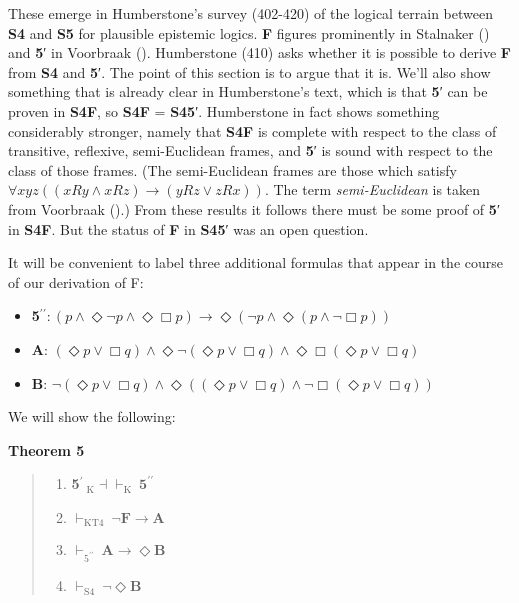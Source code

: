\documentclass[
  10pt,
  letterpaper,
  DIV=11,
  numbers=noendperiod,
  twoside]{scrartcl}
\providecommand{\tightlist}{%
  \setlength{\itemsep}{0pt}\setlength{\parskip}{0pt}}\usepackage{longtable,booktabs,array}
\begin{document}
These emerge in Humberstone's survey (402-420) of the logical terrain
between \textbf{S4} and \textbf{S5} for plausible epistemic logics.
\textbf{F} figures prominently in Stalnaker
() and \textbf{5}′ in Voorbraak
(). Humberstone (410) asks whether it
is possible to derive \textbf{F} from \textbf{S4} and \textbf{5}′. The
point of this section is to argue that it is. We'll also show something
that is already clear in Humberstone's text, which is that \textbf{5}′
can be proven in \textbf{S4F}, so \textbf{S4F} = \textbf{S45}′.
Humberstone in fact shows something considerably stronger, namely that
\textbf{S4F} is complete with respect to the class of transitive,
reflexive, semi-Euclidean frames, and \textbf{5}′ is sound with respect
to the class of those frames. (The semi-Euclidean frames are those which
satisfy \(\forall xyz((xRy \wedge xRz) \rightarrow (yRz \vee zRx))\).
The term \emph{semi-Euclidean} is taken from Voorbraak
().) From these results it follows
there must be some proof of \textbf{5}′ in \textbf{S4F}. But the status
of \textbf{F} in \textbf{S45}′ was an open question.

It will be convenient to label three additional formulas that appear in
the course of our derivation of F:

\begin{itemize}
\tightlist
\item
  \textbf{5}\(^{\prime\prime}\!: (p \wedge \Diamond\neg p \wedge \Diamond\Box p) \rightarrow \Diamond(\neg p \wedge \Diamond(p\wedge \neg \Box p))\)
\item
  \textbf{A}:
  \((\Diamond{p}\vee \Box q) \wedge \Diamond\neg (\Diamond{p}\vee \Box q) \wedge \Diamond\Box (\Diamond{p}\vee \Box q)\)
\item
  \textbf{B}:
  \(\neg (\Diamond{p}\vee \Box q) \wedge \Diamond((\Diamond{p}\vee \Box q) \wedge \neg \Box (\Diamond{p}\vee \Box q))\)
\end{itemize}

We will show the following:

\textbf{Theorem 5}

\begin{quote}
\begin{enumerate}
\def\labelenumi{\roman{enumi}.}
\tightlist
\item
  \textbf{5}\(^{\prime}~_{\text{K}}\!{\dashv}{\vdash}_\text{K}~\textbf{5}^{\prime\prime}\)
\item
  \(\vdash_\text{KT4} ~ \neg \textbf{F}\rightarrow \textbf{A}\)
\item
  \(\vdash_{\text{5}^{\prime\prime}} ~\textbf{A}\rightarrow \Diamond\textbf{B}\)
\item
  \(\vdash_\text{S4} ~\neg \Diamond\textbf{B}\)
\end{enumerate}
\end{quote}
\end{document}
